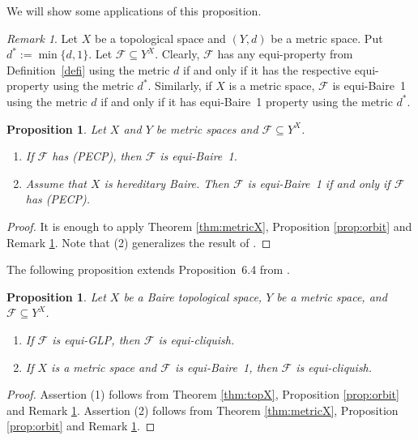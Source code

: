 \documentclass[a4paper]{amsart}
\theoremstyle{plain}
\newtheorem{proposition}[theorem]{Proposition}
\theoremstyle{definition}
\theoremstyle{remark}
\newtheorem{remark}[theorem]{Remark}
\numberwithin{equation}{section}
\begin{document}
    We will show some applications of this proposition.

    \begin{remark} \label{remi}
    Let $X$ be a topological space and $(Y,d)$ be a metric space. Put $d^*:=\min\{d,1\}$. Let $\mathcal F\subseteq Y^X$.
    Clearly, $\mathcal F$ has any equi-property from 
    Definition~\ref{defi} using the metric $d$ if and only if it has the respective equi-property using the metric $d^*$. Similarly,
    if $X$ is a metric space, $\mathcal F$ is equi-Baire~1  using  the metric $d$ if and only if it has equi-Baire~1 property using the metric $d^*$.
    \end{remark}

    \begin{proposition} \label{propa1}
    Let $X$ and $Y$ be metric spaces and $\mathcal F\subseteq Y^X$. \begin{enumerate}
        \item If $\mathcal F$ has (PECP), then $\mathcal F$ is equi-Baire~1.
        \item Assume that $X$ is hereditary Baire. Then 
        $\mathcal F$ is equi-Baire~1 if and only if $\mathcal F$ has (PECP).
    \end{enumerate}
    \end{proposition}
    \begin{proof}
        It is enough to apply Theorem \ref{thm:metricX}, 
        Proposition \ref{prop:orbit} and Remark \ref{remi}. Note that (2) generalizes the result of \cite[Proposition 32]{Le}.
    \end{proof}

    The following proposition extends Proposition~6.4 from \cite{BHH}.

    \begin{proposition} \label{propa2}
      Let $X$ be a Baire topological space, $Y$ be a metric space, and $\mathcal F\subseteq Y^X$. 
      \begin{enumerate} 
      \item If $\mathcal F$ is equi-GLP, then $\mathcal F$ is equi-cliquish.
      \item If $X$ is a metric space and $\mathcal F$ is equi-Baire~1, then $\mathcal F$ is equi-cliquish.
      \end{enumerate}
    \end{proposition}
    \begin{proof}
    Assertion (1) follows from Theorem \ref{thm:topX}, Proposition \ref{prop:orbit} and Remark \ref{remi}. Assertion (2) follows from Theorem \ref{thm:metricX}, Proposition \ref{prop:orbit} and Remark \ref{remi}.
    \end{proof}
\end{document}
